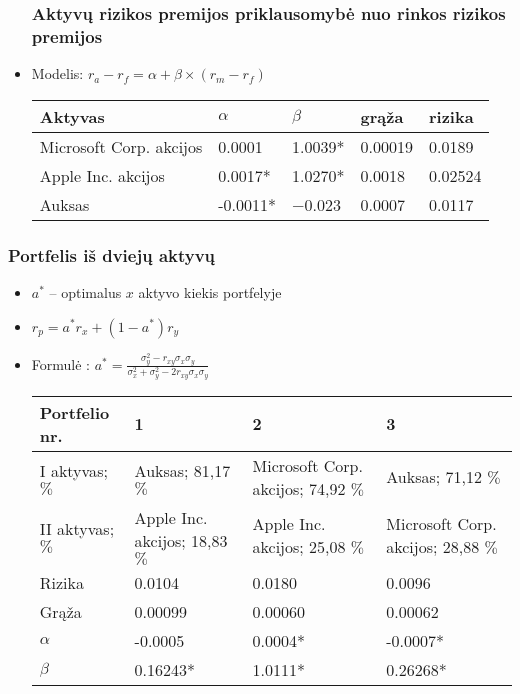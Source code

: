 \documentclass[utf8,hyperref={unicode},xcolor=dvipsnames]{beamer}
\theoremstyle{change}\newtheorem{teorema}{Teiginys}
\theoremstyle{change}\newtheorem{salyga}{}
\begin{document}
\begin{frame}
    \begin{itemize}
    \frametitle{Aktyvų rizikos premijos priklausomybė nuo rinkos rizikos premijos} 
\item Modelis: $r_a - r_f = \alpha + \beta \times (r_m - r_f)$

\begin{table}[ht]
\begin{center}
    \begin{tabular}{ | l | l | l | l | l |}
    \hline
    Aktyvas & $\alpha $&$\beta$ &  grąža & rizika  \\
    \hline
  Microsoft Corp. akcijos & 0.0001 & 1.0039* & 0.00019 & 0.0189 \\
	Apple Inc. akcijos & 0.0017* & 1.0270* & 0.0018 & 0.02524 \\
  Auksas & -0.0011* & −0.023 & 0.0007 & 0.0117 \\
	\hline
    \end{tabular}
\end{center}
\end{table}
	    \end{itemize}
\end{frame}
\begin{frame}
    \frametitle{Portfelis iš dviejų aktyvų}
    \begin{itemize}
\item $a^{\ast}$ -- optimalus $x$ aktyvo kiekis portfelyje
\item $r_p = a^{\ast}r_x + (1 - a^{\ast})r_y$
	\item Formulė : $a^{\ast}= \frac{\sigma_y^2 - r_{xy}\sigma_x \sigma_y}{\sigma^2_x + \sigma^2_y - 2r_{xy}\sigma_x \sigma_y} \label{form}$


\begin{table}[ht]
\begin{center}

\resizebox{11cm}{!} {
    \begin{tabular}{ | l | l | l | l | }
    \hline
    Portfelio nr. & 1 & 2 & 3\\
    \hline
    I aktyvas; $\%$ & Auksas; 81,17 $\%$ & Microsoft Corp. akcijos; 74,92 $\%$ & Auksas; 71,12 $\%$ \\
    \hline
    II aktyvas; $\%$ & Apple Inc. akcijos; 18,83 $\%$ & Apple Inc. akcijos; 25,08 $\%$ & Microsoft Corp. akcijos; 28,88 $\%$ \\
    \hline
    Rizika & 0.0104 & 0.0180 & 0.0096 \\
    \hline
    Grąža & 0.00099 & 0.00060 & 0.00062 \\
\hline
$\alpha$ & -0.0005 & 0.0004* & -0.0007* \\
    \hline
    $\beta$ & 0.16243* & 1.0111* & 0.26268*\\
	\hline	
    \end{tabular}
    }

\end{center}
\end{table}

\end{itemize}
\end{frame}
\end{document}
